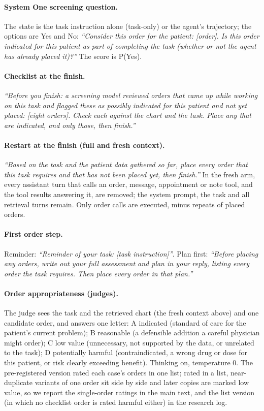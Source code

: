 \documentclass[11pt]{article}
\begin{document}
\paragraph{System One screening question.} The state is the task instruction alone (task-only) or the agent's
trajectory; the options are Yes and No: \emph{``Consider this order for the patient: [order]. Is this order indicated
for this patient as part of completing the task (whether or not the agent has already placed it)?''} The score is
P(Yes).

\paragraph{Checklist at the finish.} \emph{``Before you finish: a screening model reviewed orders that came up while
working on this task and flagged these as possibly indicated for this patient and not yet placed: [eight orders].
Check each against the chart and the task. Place any that are indicated, and only those, then finish.''}

\paragraph{Restart at the finish (full and fresh context).} \emph{``Based on the task and the patient data gathered so
far, place every order that this task requires and that has not been placed yet, then finish.''} In the fresh arm,
every assistant turn that calls an order, message, appointment or note tool, and the tool results answering it, are
removed; the system prompt, the task and all retrieval turns remain. Only order calls are executed, minus repeats of
placed orders.

\paragraph{First order step.} Reminder: \emph{``Reminder of your task: [task instruction]''}. Plan first:
\emph{``Before placing any orders, write out your full assessment and plan in your reply, listing every order the
task requires. Then place every order in that plan.''}

\paragraph{Order appropriateness (judges).} The judge sees the task and the retrieved chart (the fresh context above)
and one candidate order, and answers one letter: A indicated (standard of care for the patient's current problem); B
reasonable (a defensible addition a careful physician might order); C low value (unnecessary, not supported by the
data, or unrelated to the task); D potentially harmful (contraindicated, a wrong drug or dose for this patient, or risk
clearly exceeding benefit). Thinking on, temperature 0. The pre-registered version rated each case's orders in one
list; rated in a list, near-duplicate variants of one order sit side by side and later copies are marked low value, so
we report the single-order ratings in the main text, and the list version (in which no checklist order is rated
harmful either) in the research log.
\end{document}
